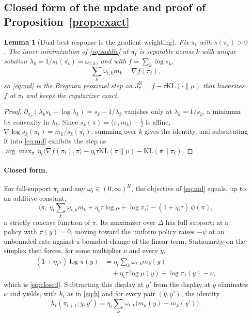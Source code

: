 \documentclass[letterpaper]{article} %
\newtheorem{lemma}{Lemma}
\newcommand{\KL}{\mathrm{KL}}
\begin{document}
\subsection{Closed form of the update and proof of Proposition~\ref{prop:exact}}
\begin{lemma}[Dual best response is the gradient weighting]\label{lem:equiv}
Fix $\pi_t$ with $s(\pi_t)>0$. The inner minimization of \eqref{eq:saddle} at $\pi_t$ is separable across $k$ with unique solution $\lambda_k=1/s_k(\pi_t)=\omega_{t,k}$, and with $f=\sum_k\log s_k$,
\[
\sum_k\omega_{t,k}m_k=\nabla f(\pi_t),
\]
so \eqref{eq:md} is the Bregman proximal step on $J^{\mathrm N}_\tau=f-\tau\KL(\cdot\|\mu)$ that linearizes $f$ at $\pi_t$ and keeps the regularizer exact.
\end{lemma}
\begin{proof}
$\partial_{\lambda_k}(\lambda_ks_k-\log\lambda_k)=s_k-1/\lambda_k$ vanishes only at $\lambda_k=1/s_k$, a minimum by convexity in $\lambda_k$. Since $s_k(\pi)=\langle\pi,m_k\rangle-\tfrac12$ is affine, $\nabla\log s_k(\pi_t)=m_k/s_k(\pi_t)$; summing over $k$ gives the identity, and substituting it into \eqref{eq:md} exhibits the step as $\arg\max_\pi\,\eta_t\langle\nabla f(\pi_t),\pi\rangle-\eta_t\tau\KL(\pi\|\mu)-\KL(\pi\|\pi_t)$.
\end{proof}

\paragraph{Closed form.}
For full-support $\pi_t$ and any $\omega_t\in(0,\infty)^K$, the objective of \eqref{eq:md} equals, up to an additive constant,
\[
\big\langle\pi,\ \eta_t{\textstyle\sum_k}\omega_{t,k}m_k+\eta_t\tau\log\mu+\log\pi_t\big\rangle-(1+\eta_t\tau)\,\psi(\pi),
\]
a strictly concave function of $\pi$. Its maximizer over $\Delta$ has full support: at a policy with $\pi(y)=0$, moving toward the uniform policy raises $-\psi$ at an unbounded rate against a bounded change of the linear term. Stationarity on the simplex then forces, for some multiplier $\nu$ and every $y$,
\[
\begin{aligned}
(1+\eta_t\tau)\log\pi(y)&=\eta_t{\textstyle\sum_k}\omega_{t,k}m_k(y)\\
&\quad+\eta_t\tau\log\mu(y)+\log\pi_t(y)-\nu,
\end{aligned}
\]
which is \eqref{eq:closed}. Subtracting this display at $y'$ from the display at $y$ eliminates $\nu$ and yields, with $h_t$ as in \eqref{eq:h} and for every pair $(y,y')$, the identity
\begin{equation}
h_t(\pi_{t+1};y,y')=\eta_t\sum_k\omega_{t,k}\big(m_k(y)-m_k(y')\big).
\label{eq:pairid}
\end{equation}
\end{document}
